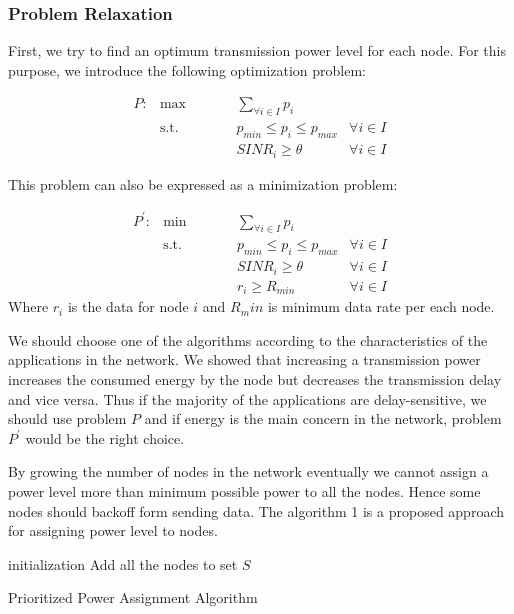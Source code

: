 \documentclass[12pt,final,3p]{CSP}
\begin{document}
\subsubsection{Problem Relaxation}
First, we try to find an optimum transmission power level for each node. For this purpose, we introduce the following optimization problem:

\begin{subequations}
\begin{alignat}{2}
P: &\!\max &\qquad& \sum_{\forall i \in I} p_i&\\
&\text{s.t.} &      & p_{min} \leq p_i \leq p_{max}& \forall i \in I \\
& &      & SINR_{i} \geq \theta & \forall i \in I 
\label{eq:main}
\end{alignat}
\end{subequations}

This problem can also be expressed as a minimization problem:

\begin{subequations}
\begin{alignat}{2}
P^\prime: &\!\min &\qquad& \sum_{\forall i \in I} p_i&\\
&\text{s.t.} &      & p_{min} \leq p_i \leq p_{max}& \forall i \in I \\
& &      & SINR_{i} \geq \theta & \forall i \in I \\
& &      & r_{i} \geq R_{min} & \forall i \in I 
\label{eq:main}
\end{alignat}
\end{subequations}
Where $r_{i}$ is the data for node $i$ and $R_min$ is minimum data rate per each node. 

We should choose one of the algorithms according to the characteristics of the applications in the network. We showed that increasing a transmission power increases the consumed energy by the node but decreases the transmission delay and vice versa. Thus if the majority of the applications are delay-sensitive, we should use problem $P$ and if energy is the main concern in the network, problem $P^\prime$ would be the right choice.

By growing the number of nodes in the network eventually we cannot assign a power level more than minimum possible power to all the nodes. Hence some nodes should backoff form sending data. The algorithm 1 is a proposed approach for assigning power level to nodes.

 
\begin{algorithm}[H]
\SetAlgoLined
{}
 initialization\;
 Add all the nodes to set $S$\;
 \caption{Prioritized Power Assignment Algorithm}
\end{algorithm}
\end{document}
